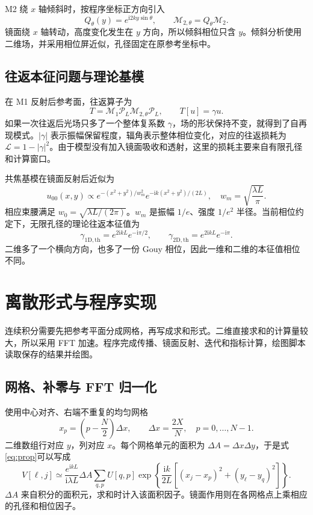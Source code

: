 \documentclass[UTF8,a4paper,11pt,fontset=fandol]{ctexart}
\newcommand{\ii}{\mathrm{i}}
\begin{document}
M2 绕 $x$ 轴倾斜时，按程序坐标正方向引入
\begin{equation}
 Q_\theta(y)=e^{\ii2ky\sin\theta},\qquad
 \mathcal M_{2,\theta}=Q_\theta\mathcal M_2.
\end{equation}
镜面绕 $x$ 轴转动，高度变化发生在 $y$ 方向，所以倾斜相位只含 $y$。倾斜分析使用二维场，并采用相位屏近似，孔径固定在原参考坐标中。

\subsection{往返本征问题与理论基模}
在 M1 反射后参考面，往返算子为
\begin{equation}
 T=\mathcal M_1\mathcal P_L\mathcal M_{2,\theta}\mathcal P_L,
 \qquad T[u]=\gamma u.
\end{equation}
如果一次往返后光场只多了一个整体复系数 $\gamma$，场的形状保持不变，就得到了自再现模式。$|\gamma|$ 表示振幅保留程度，辐角表示整体相位变化，对应的往返损耗为 $\mathcal L=1-|\gamma|^2$。由于模型没有加入镜面吸收和透射，这里的损耗主要来自有限孔径和计算窗口。

共焦基模在镜面反射后近似为
\begin{equation}
 u_{00}(x,y)\propto e^{-(x^2+y^2)/w_m^2}e^{-\ii k(x^2+y^2)/(2L)},
 \quad w_m=\sqrt{\frac{\lambda L}{\pi}}.
\end{equation}
相应束腰满足 $w_0=\sqrt{\lambda L/(2\pi)}$。$w_m$ 是振幅 $1/e$、强度 $1/e^2$ 半径。当前相位约定下，无限孔径的理论往返本征值为
\begin{equation}
 \gamma_{\mathrm{1D,th}}=e^{2\ii kL}e^{-\ii\pi/2},\qquad
 \gamma_{\mathrm{2D,th}}=e^{2\ii kL}e^{-\ii\pi}.
\end{equation}
二维多了一个横向方向，也多了一份 Gouy 相位，因此一维和二维的本征值相位不同。

\section{离散形式与程序实现}
连续积分需要先把参考平面分成网格，再写成求和形式。二维直接求和的计算量较大，所以采用 FFT 加速。程序完成传播、镜面反射、迭代和指标计算，绘图脚本读取保存的结果并绘图。

\subsection{网格、补零与 FFT 归一化}
使用中心对齐、右端不重复的均匀网格
\begin{equation}
 x_p=\left(p-\frac N2\right)\Delta x,\qquad \Delta x=\frac{2X}{N},\quad p=0,\ldots,N-1.
\end{equation}
二维数组行对应 $y$，列对应 $x$。每个网格单元的面积为 $\Delta A=\Delta x\Delta y$，于是式\eqref{eq:prop}可以写成
\begin{equation}
 V[\ell,j]\simeq\frac{e^{\ii kL}}{\ii\lambda L}\Delta A
 \sum_{q,p}U[q,p]\exp\!\left\{\frac{\ii k}{2L}
 \left[(x_j-x_p)^2+(y_\ell-y_q)^2\right]\right\}.
\end{equation}
$\Delta A$ 来自积分的面积元，求和时计入该面积因子。镜面作用则在各网格点上乘相应的孔径和相位因子。
\end{document}

